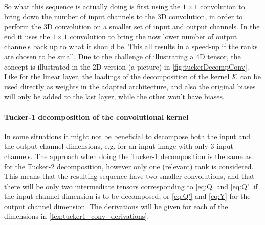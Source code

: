 So what this sequence is actually doing is first using the $1\times 1$ convolution to bring down the number of input channels to the 3D convolution, in order to perform the 3D convolution on a smaller set of input and output channels. In the end it uses the $1\times 1$ convolution to bring the now lower number of output channels back up to what it should be. This all results in a speed-up if the ranks are chosen to be small. Due to the challenge of illustrating a 4D tensor, the concept is illustrated in the 2D version (a picture) in \autoref{fig:tuckerDecompConv}. Like for the linear layer, the loadings of the decomposition of the kernel $\mathcal{K}$ can be used directly as weights in the adapted architecture, and also the original biases will only be added to the last layer, while the other won't have biases.

\paragraph{Tucker-1 decomposition of the convolutional kernel}
In some situations it might not be beneficial to decompose both the input and the output channel dimensions, e.g. for an input image with only 3 input channels. The approach when doing the Tucker-1 decomposition is the same as for the Tucker-2 decomposition, however only one (relevant) rank is considered. This means that the resulting sequence have two smaller convolutions, and that there will be only two intermediate tensors corresponding to \eqref{eq:Q} and \eqref{eq:Q'} if the input channel dimension is to be decomposed, or \eqref{eq:Q'} and \eqref{eq:Y} for the output channel dimension. The derivations will be given for each of the dimensions in \autoref{tex:tucker1_conv_derivations}.

